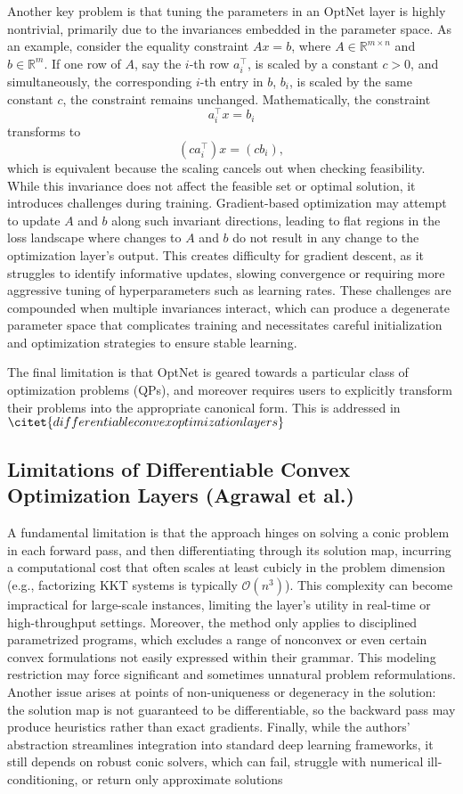 \documentclass{article}
\begin{document}
Another key problem is that tuning the parameters in an OptNet layer is highly nontrivial, primarily due to the invariances embedded in the parameter space. As an example, consider the equality constraint \(A x = b\), where \(A \in \mathbb{R}^{m \times n}\) and \(b \in \mathbb{R}^m\). If one row of \(A\), say the \(i\)-th row \(a_i^\top\), is scaled by a constant \(c > 0\), and simultaneously, the corresponding \(i\)-th entry in \(b\), \(b_i\), is scaled by the same constant \(c\), the constraint remains unchanged. Mathematically, the constraint 
\[
a_i^\top x = b_i
\]
transforms to 
\[
(c a_i^\top) x = (c b_i),
\]
which is equivalent because the scaling cancels out when checking feasibility. While this invariance does not affect the feasible set or optimal solution, it introduces challenges during training. Gradient-based optimization may attempt to update \(A\) and \(b\) along such invariant directions, leading to flat regions in the loss landscape where changes to \(A\) and \(b\) do not result in any change to the optimization layer’s output. This creates difficulty for gradient descent, as it struggles to identify informative updates, slowing convergence or requiring more aggressive tuning of hyperparameters such as learning rates. These challenges are compounded when multiple invariances interact, which can produce a degenerate parameter space that complicates training and necessitates careful initialization and optimization strategies to ensure stable learning. 

The final limitation is that OptNet is geared towards a particular class of optimization problems (QPs), and moreover requires users to explicitly transform their problems into the appropriate canonical form. This is addressed in $\citet{differentiableconvexoptimizationlayers}$

\subsection{Limitations of Differentiable Convex Optimization Layers (Agrawal et al.)}

A fundamental limitation is that the approach hinges on solving a conic problem in each forward pass, and then differentiating through its solution map, incurring a computational cost that often scales at least cubicly in the problem dimension (e.g., factorizing KKT systems is typically $\mathcal{O}(n^3)$). This complexity can become impractical for large-scale instances, limiting the layer’s utility in real-time or high-throughput settings. Moreover, the method only applies to disciplined parametrized programs, which excludes a range of nonconvex or even certain convex formulations not easily expressed within their grammar. This modeling restriction may force significant and sometimes unnatural problem reformulations. Another issue arises at points of non-uniqueness or degeneracy in the solution: the solution map is not guaranteed to be differentiable, so the backward pass may produce heuristics rather than exact gradients. Finally, while the authors’ abstraction streamlines integration into standard deep learning frameworks, it still depends on robust conic solvers, which can fail, struggle with numerical ill-conditioning, or return only approximate solutions
\end{document}
